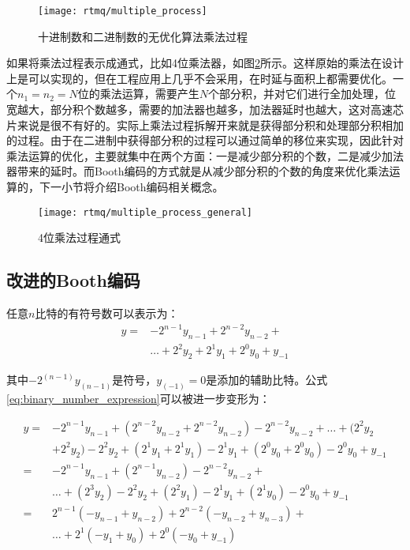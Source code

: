 \begin{figure}
    \centering
    \caption[十进制数和二进制数的无优化算法乘法过程]{十进制数和二进制数的无优化算法乘法过程\label{fig:multiple_process}}
    \texttt{[image: rtmq/multiple\_process]}
\end{figure}

如果将乘法过程表示成通式，比如4位乘法器，如图\ref{fig:multiple_process_general}所示。这样原始的乘法在设计上是可以实现的，但在工程应用上几乎不会采用，在时延与面积上都需要优化。一个$n_1=n_2=N$位的乘法运算，需要产生$N$个部分积，并对它们进行全加处理，位宽越大，部分积个数越多，需要的加法器也越多，加法器延时也越大，这对高速芯片来说是很不有好的。实际上乘法过程拆解开来就是获得部分积和处理部分积相加的过程。由于在二进制中获得部分积的过程可以通过简单的移位来实现，因此针对乘法运算的优化，主要就集中在两个方面：一是减少部分积的个数，二是减少加法器带来的延时。而Booth编码的方式就是从减少部分积的个数的角度来优化乘法运算的，下一小节将介绍Booth编码相关概念。

\begin{figure}
    \centering
    \caption[4位乘法过程通式]{4位乘法过程通式\label{fig:multiple_process_general}}
    \texttt{[image: rtmq/multiple\_process\_general]}
\end{figure}

\subsection[改进的Booth编码]{改进的Booth编码}

任意$n$比特的有符号数可以表示为：
\begin{align}
    y=&-2^{n-1} y_{n-1}+2^{n-2} y_{n-2}+\\
    &…+2^2 y_2+2^1 y_1+2^0 y_0+y_{-1}\label{eq:binary_number_expression}
\end{align}

其中$-2^(n-1) y_(n-1)$是符号，$y_(-1)=0$是添加的辅助比特。公式\ref{eq:binary_number_expression}可以被进一步变形为：

\begin{align}
    y=&-2^{n-1} y_{n-1}+(2^{n-2} y_{n-2}+2^{n-2} y_{n-2} )-2^{n-2} y_{n-2}+…+(2^2 y_2\\
    &+2^2 y_2 )-2^2 y_2+(2^1 y_1+2^1 y_1 )-2^1 y_1+(2^0 y_0+2^0 y_0 )-2^0 y_0+y_{-1}\\
    =&-2^{n-1} y_{n-1}+(2^{n-1} y_{n-2} )-2^{n-2} y_{n-2}+\\
    &…+(2^3 y_2 )−2^2 y_2+(2^2 y_1 )-2^1 y_1+(2^1 y_0 )-2^0 y_0+y_{-1}\\
    =&2^{n-1} (-y_{n-1}+y_{n-2} )+2^{n-2} (-y_{n-2}+y_{n-3} )+\\
    &…+2^1 (-y_1+y_0 )+2^0 (-y_0+y_{-1})\label{eq:binary_number_expression1}
\end{align}

